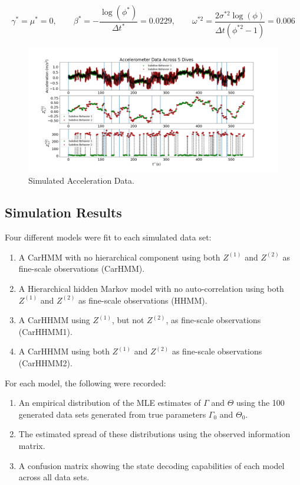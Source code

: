 $$\gamma^* = \mu^* = 0, \qquad \beta^* = -\frac{\log(\phi^*)}{\Delta t^*} = 0.0229, \qquad \omega^{*2} = \frac{2\sigma^{*2}\log(\phi)}{\Delta t (\phi^{*2}-1)} = 0.006$$

\begin{figure}[!ht]
	\centering
	\includegraphics[width=5in]{../Plots/sim_data.png}
	\caption{Simulated Acceleration Data.}
	\label{fig:sim_data}
\end{figure}


\subsection{Simulation Results}

Four different models were fit to each simulated data set:

\begin{enumerate}
    \item A CarHMM with no hierarchical component using both $Z^{(1)}$ and $Z^{(2)}$ as fine-scale observations (CarHMM).
    \item A Hierarchical hidden Markov model with no auto-correlation using both $Z^{(1)}$ and $Z^{(2)}$ as fine-scale observations (HHMM).
    \item A CarHHMM using $Z^{(1)}$, but not $Z^{(2)}$, as fine-scale observations (CarHHMM1).
    \item A CarHHMM using both $Z^{(1)}$ and $Z^{(2)}$ as fine-scale observations (CarHHMM2).
\end{enumerate}
%
For each model, the following were recorded:
%
\begin{enumerate}
    \item An empirical distribution of the MLE estimates of $\Gamma$ and $\Theta$ using the 100 generated data sets generated from true parameters $\Gamma_0$ and $\Theta_0$.
    \item The estimated spread of these distributions using the observed information matrix.
    \item A confusion matrix showing the state decoding capabilities of each model across all data sets.
\end{enumerate}

